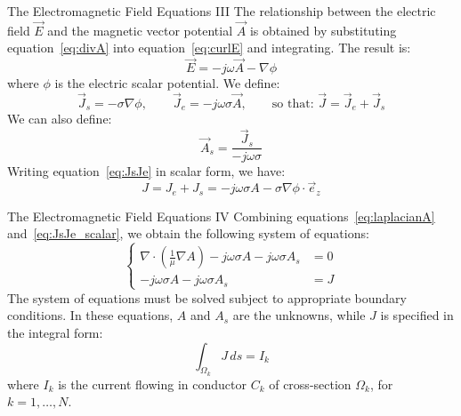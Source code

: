 \documentclass[aspectratio=54,xcolor=dvipsnames]{beamer}
\begin{document}
\begin{frame}{The Electromagnetic Field Equations III}
    The relationship between the electric field $\vec{E}$ and the magnetic vector potential $\vec{A}$ is obtained by substituting equation~\eqref{eq:divA} into equation~\eqref{eq:curlE} and integrating. The result is:
    \begin{equation}
        \vec{E} = -j\omega \vec{A} - \nabla \phi \label{eq:E}
    \end{equation}
    where $\phi$ is the electric scalar potential.
    \newline
    We define:
    \begin{equation}
        \vec{J}_s = - \sigma \nabla \phi, \qquad
        \vec{J}_e = - j \omega \sigma \vec{A},  \qquad 
        \text{so that: } \vec{J} = \vec{J}_e + \vec{J}_s \label{eq:JsJe}
    \end{equation}
    We can also define:
    \begin{equation}
        \vec{A}_s =  \frac{\vec{J}_s}{- j \omega \sigma}
    \end{equation}
    Writing equation~\eqref{eq:JsJe} in scalar form, we have: 
    \begin{equation}
        J = J_e + J_s = - j \omega \sigma A - \sigma \nabla \phi \cdot \vec{e}_z \label{eq:JsJe_scalar}
    \end{equation}
\end{frame}

\begin{frame}{The Electromagnetic Field Equations IV}
    Combining equations~\eqref{eq:laplacianA} and~\eqref{eq:JsJe_scalar}, we obtain the following system of equations:
    \begin{equation}\label{eq:system_equations}
        \left\{
        \begin{aligned}
            \nabla \cdot \left( \frac{1}{\mu} \nabla A \right) - j\omega \sigma A - j\omega \sigma A_s &= 0 
            \\[1em]
            - j\omega \sigma A - j\omega \sigma A_s &= J 
        \end{aligned}
        \right.
    \end{equation}
    The system of equations must be solved subject to appropriate boundary conditions. In these equations, $A$ and $A_s$ are the unknowns, while $J$ is specified in the integral form:
    \begin{equation}
        \int_{\Omega_k} J \, ds = I_k
        \label{eq:current_constraint}
    \end{equation}
    where $I_k$ is the current flowing in conductor $C_k$ of cross-section $\Omega_k$, for $k = 1, \ldots, N$.
\end{frame}
\end{document}
